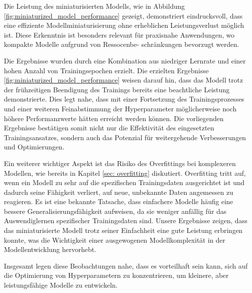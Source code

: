 Die Leistung des miniaturisierten Modells, wie in Abbildung \ref{fig:miniaturized_model_performance} gezeigt, demonstriert eindrucksvoll, dass eine effiziente Modellminiaturisierung ohne erheblichen Leistungsverlust möglich ist. Diese Erkenntnis ist besonders relevant für praxisnahe Anwendungen, wo kompakte Modelle aufgrund von 
Ressocenbe- schränkungen bevorzugt werden.

Die Ergebnisse wurden durch eine Kombination aus niedriger Lernrate und einer hohen Anzahl von Trainingsepochen erzielt. Die erzielten Ergebnisse \ref{fig:miniaturized_model_performance} weisen darauf hin, dass das Modell trotz der frühzeitigen Beendigung des Trainings bereits eine beachtliche Leistung demonstrierte. Dies legt nahe, dass mit einer Fortsetzung des Trainingsprozesses und einer weiteren Feinabstimmung der Hyperparameter möglicherweise noch höhere Performanzwerte hätten erreicht werden können. Die vorliegenden Ergebnisse bestätigen somit nicht nur die Effektivität des eingesetzten Trainingsansatzes, sondern auch das Potenzial für weitergehende Verbesserungen und Optimierungen.

Ein weiterer wichtiger Aspekt ist das Risiko des Overfittings bei komplexeren Modellen, wie bereits in Kapitel \ref{sec: overfitting} diskutiert. Overfitting tritt auf, wenn ein Modell zu sehr auf die spezifischen Trainingsdaten ausgerichtet ist und dadurch seine Fähigkeit verliert, auf neue, unbekannte Daten angemessen zu reagieren. Es ist eine bekannte Tatsache, dass einfachere Modelle häufig eine bessere Generalisierungsfähigkeit aufweisen, da sie weniger anfällig für das Auswendiglernen spezifischer Trainingsdaten sind. Unsere Ergebnisse zeigen, dass das miniaturisierte Modell trotz seiner Einfachheit eine gute Leistung erbringen konnte, was die Wichtigkeit einer ausgewogenen Modellkomplexität in der Modellentwicklung hervorhebt. 

Insgesamt legen diese Beobachtungen nahe, dass es vorteilhaft sein kann, sich auf die Optimierung von Hyperparametern zu konzentrieren, um kleinere, aber leistungsfähige Modelle zu entwickeln.
